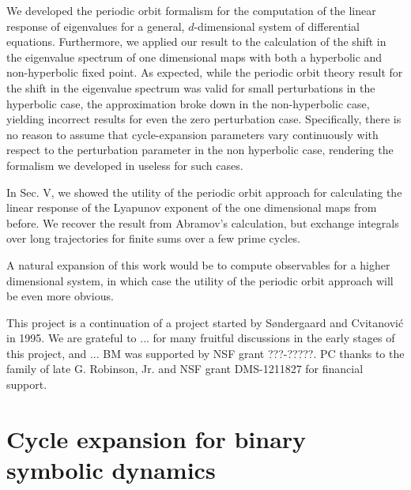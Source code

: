 \documentclass[aps,pre,
                showpacs,
                twocolumn,
                groupedaddress,
                floatfix]{revtex4-1}
\begin{document}
We developed the periodic orbit formalism for the computation of the
linear response of eigenvalues for a general, $d$-dimensional system of
differential equations. Furthermore, we applied our result to the
calculation of the shift in the eigenvalue spectrum of one dimensional
maps with both a hyperbolic and non-hyperbolic fixed point. As expected,
while the periodic orbit theory result for the shift in the eigenvalue
spectrum was valid for small perturbations in the hyperbolic case, the
approximation broke down in the non-hyperbolic case, yielding incorrect
results for even the zero perturbation case. Specifically, there is no
reason to assume that cycle-expansion parameters vary continuously with
respect to the perturbation parameter in the non hyperbolic case,
rendering the formalism we developed in  useless for such cases.

In Sec. V, we showed the utility of the periodic orbit approach for
calculating the linear response of the Lyapunov exponent of the one
dimensional maps from before. We recover the result from Abramov's
calculation, but exchange integrals over long trajectories for finite
sums over a few prime cycles.

A natural expansion of this work would be to compute observables for a
higher dimensional system, in which case the utility of the periodic
orbit approach will be even more obvious.

\begin{acknowledgments}
This project is a continuation of a project started by S{\o}ndergaard and
Cvitanovi\'c in 1995.
We are grateful to ... for many fruitful discussions in
the early stages of this project, and ...
BM was supported by NSF grant ???-?????.
PC thanks to the family of late G. Robinson, Jr. and NSF grant
DMS-1211827 for financial support.
\end{acknowledgments}

\appendix
\section{Cycle expansion for binary symbolic dynamics}
\label{appe:cyclBinarySymbolic}
\end{document}
